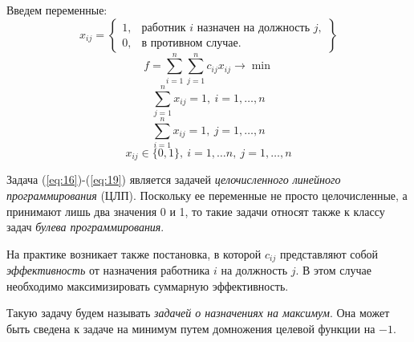 Введем переменные:
\[
	x_{ij} = \left\{\begin{array}{ll}
		1, & \text{работник $i$ назначен на должность $j$}, \\
		0, & \text{в противном случае}.
	\end{array}\right\}
\]
\begin{equation}\label{eq:16}
	f = \sum_{i=1}^{n} \sum_{j=1}^{n} c_{ij} x_{ij} \rightarrow \min
\end{equation}
\begin{equation}\label{eq:17}
	\sum_{j=1}^{n} x_{ij} =1, \ i = 1,\ldots ,n
\end{equation}
\begin{equation}\label{eq:18}
	\sum_{i=1}^{n} x_{ij} =1, \ j = 1,\ldots ,n
\end{equation}
\begin{equation}\label{eq:19}
	x_{ij} \in \{0,1\}, \ i = 1,\ldots n, \ j = 1,\ldots ,n
\end{equation}

\begin{definition}
	Задача (\ref{eq:16})-(\ref{eq:19}) является задачей \emph{целочисленного линейного программирования} (ЦЛП). Поскольку ее переменные не просто целочисленные, а принимают лишь два значения 0 и 1, то такие задачи относят также к классу задач \emph{булева программирования}.
\end{definition}

\begin{definition}
	На практике возникает также постановка, в которой $c_{ij} $ представляют собой \emph{эффективность} от назначения работника $i$ на должность $j$. В этом случае необходимо максимизировать суммарную эффективность.

	Такую задачу будем называть \emph{задачей о назначениях на максимум}. Она может быть сведена к задаче на минимум путем домножения целевой функции на $-1$.
\end{definition}
